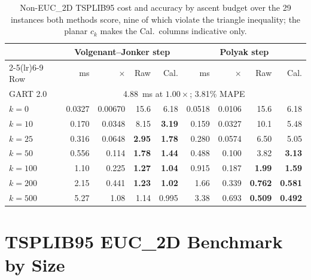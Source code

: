 \documentclass{article}
\begin{document}
\begin{table}[!htbp]
\centering
\caption{Non-EUC\_2D TSPLIB95 cost and accuracy by ascent budget over the 29 instances both methods score, nine of which violate the triangle inequality; the planar $c_k$ makes the Cal.\ columns indicative only.}
\label{tab:frontier_noneuc}
\setlength{\tabcolsep}{5pt}
\renewcommand{\arraystretch}{1.05}
\begin{tabular}{@{}lrrrrrrrr@{}}
\toprule
 & \multicolumn{4}{c}{Volgenant--Jonker step} & \multicolumn{4}{c}{Polyak step} \\
\cmidrule(lr){2-5}\cmidrule(lr){6-9}
Row & ms & $\times$ & Raw & Cal. & ms & $\times$ & Raw & Cal. \\
\midrule
GART 2.0 & \multicolumn{8}{c}{4.88~ms at $1.00\times$; 3.81\% MAPE} \\
$k=0$ & 0.0327 & 0.00670 & 15.6 & 6.18 & 0.0518 & 0.0106 & 15.6 & 6.18 \\
$k=10$ & 0.170 & 0.0348 & 8.15 & \textbf{3.19} & 0.159 & 0.0327 & 10.1 & 5.48 \\
$k=25$ & 0.316 & 0.0648 & \textbf{2.95} & \textbf{1.78} & 0.280 & 0.0574 & 6.50 & 5.05 \\
$k=50$ & 0.556 & 0.114 & \textbf{1.78} & \textbf{1.44} & 0.488 & 0.100 & 3.82 & \textbf{3.13} \\
$k=100$ & 1.10 & 0.225 & \textbf{1.27} & \textbf{1.04} & 0.915 & 0.187 & \textbf{1.99} & \textbf{1.59} \\
$k=200$ & 2.15 & 0.441 & \textbf{1.23} & \textbf{1.02} & 1.66 & 0.339 & \textbf{0.762} & \textbf{0.581} \\
$k=500$ & 5.27 & 1.08 & 1.14 & 0.995 & 3.38 & 0.693 & \textbf{0.509} & \textbf{0.492} \\
\bottomrule
\end{tabular}
\end{table}





\section{TSPLIB95 EUC\_2D Benchmark by Size} \label{app:detail_tsplib}
\end{document}
